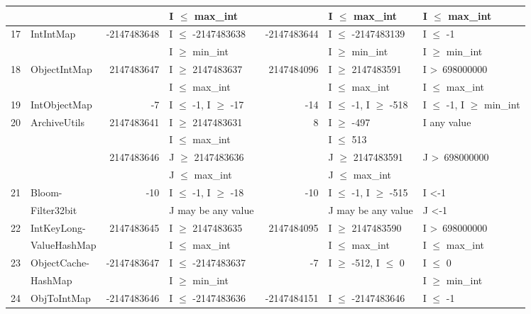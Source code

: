 {\begin{longtable}{|l|l|r|l|r|l|l|}
	&                                             &				& I $\le$ max\_int			&				& I $\le$ max\_int				& I $\le$ max\_int				\\\hline
17	& IntIntMap					&-2147483648	& I $\le$ -2147483638		&-2147483644	& I $\le$ -2147483139			& I $\le$ -1						\\ 
	&                                             &				& I $\ge$ min\_int			&				& I $\ge$ min\_int 			& I $\ge$ min\_int 					\\\hline	
18	& ObjectIntMap				&2147483647	& I $\ge$ 2147483637		&~2147484096	& I $\ge$ 2147483591			& I \textgreater~698000000		\\ 
	&                                             &				& I $\le$ max\_int			&				& I $\le$ max\_int				& I $\le$ max\_int				\\\hline
19	& IntObjectMap				&-7 			& I $\le$ -1, I $\ge$ -17		&-14 			& I $\le$ -1, I $\ge$ -518			& I $\le$ -1, I $\ge$ min\_int		\\\hline
20	& ArchiveUtils				&2147483641	& I $\ge$ 2147483631		&~8 			& I $\ge$ -497					& I any value						\\ 
	&							&				& I $\le$ max\_int			&				& I $\le$ 513					& 								\\ 
	&                                             &2147483646	& J $\ge$ 2147483636		&				& J $\ge$ 2147483591			& J \textgreater~698000000 	   	\\
	&                                             &				& J $\le$ max\_int			&				& J $\le$ max\_int				&  	   							\\\hline
21	& Bloom- 					&-10 			& I $\le$ -1, I $\ge$ -18		&-10 			& I $\le$ -1, I $\ge$ -515			& I \textless -1 					\\ 
	& Filter32bit                            &				& J may be any value			&				& J may be any value				& J \textless -1 			   		\\\hline
22	& IntKeyLong-				&2147483645	& I $\ge$ 2147483635		&~2147484095	& I $\ge$ 2147483590			& I \textgreater~698000000		\\ 
	& ValueHashMap                     &				& I $\le$ max\_int			&				& I $\le$ max\_int					& I $\le$ max\_int			\\\hline
23	& ObjectCache-				&-2147483647	& I $\le$ -2147483637		&-7 			& I $\ge$ -512, I $\le$ 0			& I $\le$ 0						\\ 
	& HashMap                              &				& I $\ge$ min\_int			&				& 								& I $\ge$ min\_int				\\\hline
24	& ObjToIntMap				&-2147483646	& I $\le$ -2147483636		&-2147484151	& I $\le$ -2147483646			& I $\le$ -1						\\ 

\end{longtable}}
